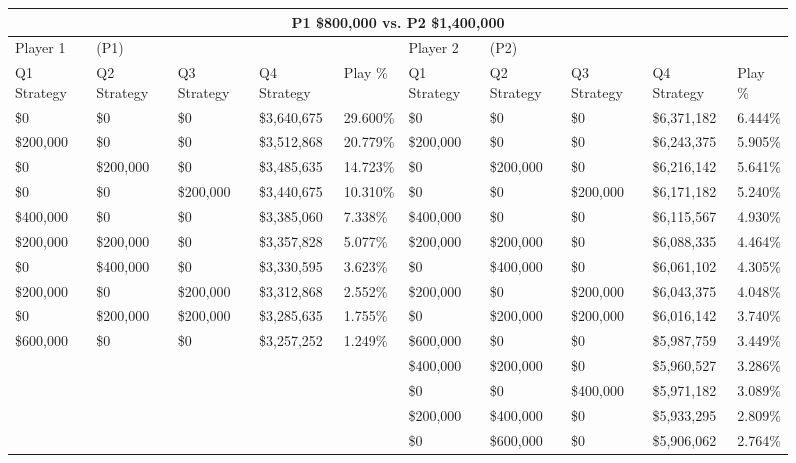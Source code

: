 \documentclass[11pt]{article}
\begin{document}
\begin{figure}
\tiny
\begin{tabular}{ |p{1.0cm}p{1.0cm}p{1.0cm}p{2.0cm}|p{1.0cm}||p{1.0cm}p{1.0cm}p{1.0cm}p{2.0cm}|p{1.0cm}|}
\hline
\multicolumn{10}{|c|}{P1 \$800,000 vs. P2 \$1,400,000} \\
\hline
Player 1 & (P1) & & & & Player 2 & (P2) & & & \\
\hline
Q1 Strategy & Q2 Strategy & Q3 Strategy & Q4 Strategy  &  Play \% & Q1 Strategy & Q2 Strategy & Q3 Strategy & Q4 Strategy  &  Play \%\\
\hline
\$0 & \$0 & \$0 & \$3,640,675  & 29.600\%           & \$0 & \$0 & \$0 & \$6,371,182  & 6.444\% \\
\$200,000 & \$0 & \$0 & \$3,512,868  & 20.779\%     & \$200,000 & \$0 & \$0 & \$6,243,375  & 5.905\% \\
\$0& \$200,000 & \$0 & \$3,485,635  & 14.723\%      & \$0& \$200,000 & \$0 & \$6,216,142  & 5.641\% \\
\$0 & \$0& \$200,000 & \$3,440,675  & 10.310\%      & \$0 & \$0& \$200,000 & \$6,171,182  & 5.240\% \\
\$400,000 & \$0 & \$0 & \$3,385,060  & 7.338\%      & \$400,000 & \$0 & \$0 & \$6,115,567  & 4.930\% \\
\$200,000& \$200,000 & \$0 & \$3,357,828  & 5.077\% & \$200,000& \$200,000 & \$0 & \$6,088,335  & 4.464\% \\
\$0& \$400,000 & \$0 & \$3,330,595  & 3.623\%       & \$0& \$400,000 & \$0 & \$6,061,102  & 4.305\% \\
\$200,000 & \$0& \$200,000 & \$3,312,868  & 2.552\% & \$200,000 & \$0& \$200,000 & \$6,043,375  & 4.048\% \\
\$0& \$200,000& \$200,000 & \$3,285,635  & 1.755\%  & \$0& \$200,000& \$200,000 & \$6,016,142  & 3.740\% \\
\$600,000 & \$0 & \$0 & \$3,257,252  & 1.249\%      & \$600,000 & \$0 & \$0 & \$5,987,759  & 3.449\% \\
&&&&                                                & \$400,000& \$200,000 & \$0 & \$5,960,527  & 3.286\% \\
&&&&                                                & \$0 & \$0& \$400,000 & \$5,971,182  & 3.089\% \\
&&&&                                                & \$200,000& \$400,000 & \$0 & \$5,933,295  & 2.809\% \\
&&&&                                                & \$0 & \$600,000 & \$0 & \$5,906,062  & 2.764\% \\

\end{tabular}
\end{figure}
\end{document}
